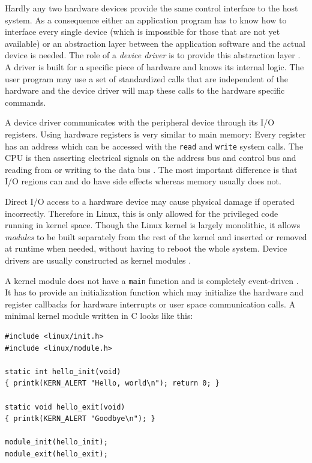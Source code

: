 Hardly any two hardware devices provide the same control interface to the host system.
As a consequence either an application program has to know how to interface every single device (which is impossible for those that are not yet available)
or an abstraction layer between the application software and the actual device is needed.
The role of a \emph{device driver} is to provide this abstraction layer \cite{ldd}.
A driver is built for a specific piece of hardware and knows its internal logic.
The user program may use a set of standardized calls that are independent of the hardware and the device driver will map these calls to the hardware specific commands.


A device driver communicates with the peripheral device through its I/O registers.
Using hardware registers is very similar to main memory: 
Every register has an address which can be accessed with the \texttt{read} and \texttt{write} system calls.
The CPU is then asserting electrical signals on the address bus and control bus and  reading from or writing to the data bus \cite{ldd}.
The most important difference is that I/O regions can and do have side effects whereas memory usually does not.


Direct I/O access to a hardware device may cause physical damage if operated incorrectly. Therefore in Linux, this is only allowed for the privileged code running in kernel space.
Though the Linux kernel is largely monolithic, it allows \emph{modules} to be built separately from the rest of the kernel and inserted or removed at runtime when needed, without having to reboot the whole system.
Device drivers are usually constructed as kernel modules \cite{ldd}.

A kernel module does not have a \texttt{main} function and is completely event-driven \cite{ldd}.
It has to provide an initialization function which may initialize the hardware and register callbacks for hardware interrupts or user space communication calls.
A minimal kernel module written in C looks like this:
\begin{lstlisting}[label=some-code,caption=Minimal kernel module]
#include <linux/init.h>
#include <linux/module.h>

static int hello_init(void)
{ printk(KERN_ALERT "Hello, world\n"); return 0; }

static void hello_exit(void)
{ printk(KERN_ALERT "Goodbye\n"); }

module_init(hello_init);
module_exit(hello_exit);
\end{lstlisting}

